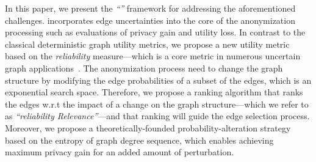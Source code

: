 
\vspace{2mm}


In this paper, we present the {\em ``\SysNameNS''} framework for addressing the aforementioned challenges. 
\SysName incorporates edge uncertainties into the core of the  anonymization processing such as evaluations of privacy gain and utility loss. 
In contrast to the classical deterministic graph utility metrics, we propose a new utility metric based on the {\em reliability} measure---which is a core metric in numerous uncertain graph applications~\cite{Asthana_Predicting_2004,Zhao_Detecting_2014,Ghosh_On_2007}. 
The anonymization process need to change the graph structure by modifying the edge probabilities of a subset of the edges, which is an exponential search space. 
Therefore, we propose a ranking algorithm that ranks the edges w.r.t the impact of a change on the graph structure---which we refer to as {\em ``reliability Relevance''}---and 
that ranking will guide the edge selection process. 
Moreover, we propose a theoretically-founded probability-alteration strategy based on the entropy of graph degree sequence, which enables achieving maximum privacy gain for an added amount of 
perturbation. 





